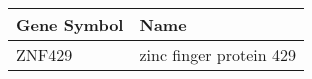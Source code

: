 \begin{tabular}{ll}
\toprule
Gene Symbol &                    Name \\
\midrule
     ZNF429 & zinc finger protein 429 \\
\bottomrule
\end{tabular}
